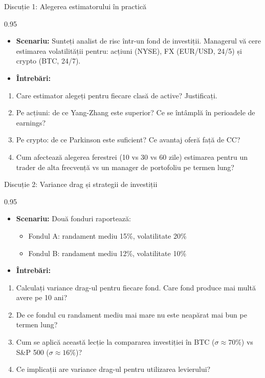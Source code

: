 \documentclass[9pt, aspectratio=169, t]{beamer}
\begin{document}
\begin{frame}[shrink=10]{Discuție 1: Alegerea estimatorului în practică}
\begin{cminipage}{0.95\textwidth}
    \begin{itemize}\setlength{\itemsep}{0pt}
        \item \textbf{Scenariu:} Sunteți analist de risc într-un fond de investiții. Managerul vă cere estimarea volatilității pentru: acțiuni (NYSE), FX (EUR/USD, 24/5) și crypto (BTC, 24/7).
        \item \textbf{Întrebări:}
    \end{itemize}
    \begin{enumerate}\setlength{\itemsep}{0pt}
        \item Care estimator alegeți pentru fiecare clasă de active? Justificați.
        \item Pe acțiuni: de ce Yang-Zhang este superior? Ce se întâmplă în perioadele de earnings?
        \item Pe crypto: de ce Parkinson este suficient? Ce avantaj oferă față de CC?
        \item Cum afectează alegerea ferestrei (10 vs 30 vs 60 zile) estimarea pentru un trader de alta frecvență vs un manager de portofoliu pe termen lung?
    \end{enumerate}
\end{cminipage}
\end{frame}

\begin{frame}[shrink=10]{Discuție 2: Variance drag și strategii de investiții}
\begin{cminipage}{0.95\textwidth}
    \begin{itemize}\setlength{\itemsep}{0pt}
        \item \textbf{Scenariu:} Două fonduri raportează:
        \begin{itemize}\setlength{\itemsep}{0pt}
            \item Fondul A: randament mediu 15\%, volatilitate 20\%
            \item Fondul B: randament mediu 12\%, volatilitate 10\%
        \end{itemize}
        \item \textbf{Întrebări:}
    \end{itemize}
    \begin{enumerate}\setlength{\itemsep}{0pt}
        \item Calculați variance drag-ul pentru fiecare fond. Care fond produce mai multă avere pe 10 ani?
        \item De ce fondul cu randament mediu mai mare nu este neapărat mai bun pe termen lung?
        \item Cum se aplică această lecție la compararea investiției în BTC ($\sigma \approx 70\%$) vs S\&P 500 ($\sigma \approx 16\%$)?
        \item Ce implicații are variance drag-ul pentru utilizarea levierului?
    \end{enumerate}
\end{cminipage}
\end{frame}
\end{document}
